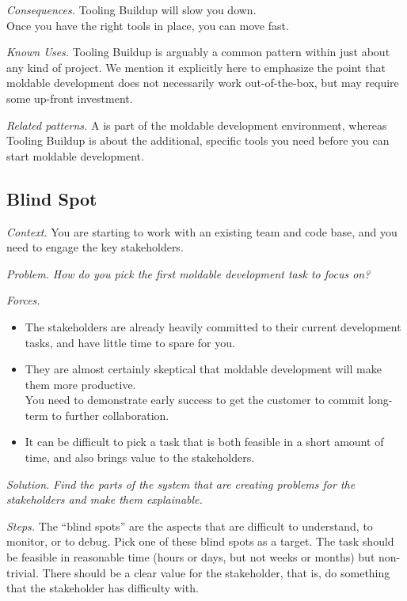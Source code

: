 \documentclass[acmsmall,screen,authorversion,nonacm]{acmart} %
\newcommand\cp[1]{\nbe{Cesare}{#1}{olive}} %
\newcommand\dd[1]{\nbe{Daniel}{#1}{magenta}} %
\newcommand\ws[1]{\nbe{Workshop}{#1}{teal}} %
\newcommand{\pattern}[2]{\needlines{10}
\subsection*{#1}\label{pat:#2}}
\newcommand{\patref}[1]{\emph{\nameref{pat:#1}}\xspace}
\newcommand{\patsec}[1]{\noindent\textit{#1.}\xspace}
\begin{document}
\patsec{Consequences}
Tooling Buildup will slow you down.\\
Once you have the right tools in place, you can move fast.

\patsec{Known Uses}
Tooling Buildup is arguably a common pattern within just about any kind of project.
We mention it explicitly here to emphasize the point that moldable development does not necessarily work out-of-the-box, but may require some up-front investment.

\patsec{Related patterns}
A \patref{MoldableTool} is part of the moldable development environment, whereas Tooling Buildup is about the additional, specific tools you need before you can start moldable development.

\pattern{Blind Spot}{BlindSpot}
\patsec{Context}
You are starting to work with an existing team and code base, and you need to engage the key stakeholders.

\patsec{Problem}
\emph{How do you pick the first moldable development task to focus on?}

\patsec{Forces}
\begin{itemize}[---]
\item The stakeholders are already heavily committed to their current development tasks, and have little time to spare for you.
\item They are almost certainly skeptical that moldable development will make them more productive.\\
You need to demonstrate early success to get the customer to commit long-term to further collaboration.
\item It can be difficult to pick a task that is both feasible in a short amount of time, and also brings value to the stakeholders.
\end{itemize}

\patsec{Solution}
\emph{Find the parts of the system that are creating problems for the stakeholders and make them explainable.}

\patsec{Steps}
The ``blind spots'' are the aspects that are difficult to understand, to monitor, or to debug.
Pick one of these blind spots as a target.
The task should be feasible in reasonable time
(\ie hours or days, but not weeks or months)
but non-trivial.
There should be a clear value for the stakeholder, that is, do something that the stakeholder has difficulty with.
\end{document}
